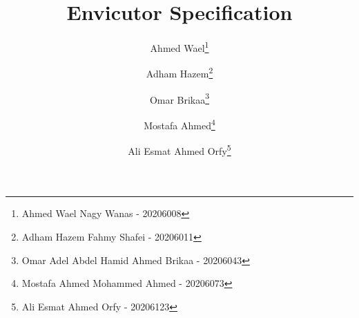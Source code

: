 \title{Envicutor Specification}
\author{
  Ahmed Wael\thanks{Ahmed Wael Nagy Wanas - 20206008}
  \and Adham Hazem\thanks{Adham Hazem Fahmy Shafei - 20206011}
  \and Omar Brikaa\thanks{Omar Adel Abdel Hamid Ahmed Brikaa - 20206043}
  \and Mostafa Ahmed\thanks{Mostafa Ahmed Mohammed Ahmed - 20206073}
  \and Ali Esmat Ahmed Orfy\thanks{Ali Esmat Ahmed Orfy - 20206123}
}
\date{}
\maketitle
\tableofcontents
\listoffigures
\listoftables
